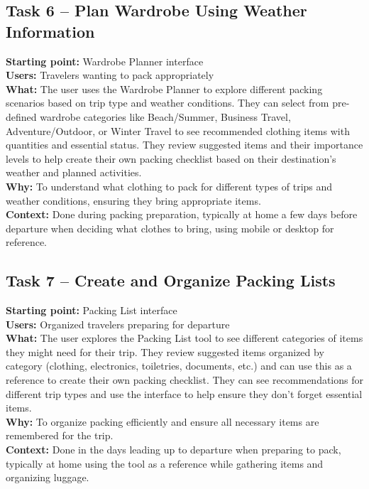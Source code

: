 \documentclass[11pt,a4paper]{article}
\begin{document}
\subsection*{Task 6 – Plan Wardrobe Using Weather Information}
\textbf{Starting point:} Wardrobe Planner interface \\
\textbf{Users:} Travelers wanting to pack appropriately \\
\textbf{What:} The user uses the Wardrobe Planner to explore different packing scenarios based on trip type and weather conditions. They can select from pre-defined wardrobe categories like Beach/Summer, Business Travel, Adventure/Outdoor, or Winter Travel to see recommended clothing items with quantities and essential status. They review suggested items and their importance levels to help create their own packing checklist based on their destination's weather and planned activities. \\
\textbf{Why:} To understand what clothing to pack for different types of trips and weather conditions, ensuring they bring appropriate items. \\
\textbf{Context:} Done during packing preparation, typically at home a few days before departure when deciding what clothes to bring, using mobile or desktop for reference.

\subsection*{Task 7 – Create and Organize Packing Lists}
\textbf{Starting point:} Packing List interface \\
\textbf{Users:} Organized travelers preparing for departure \\
\textbf{What:} The user explores the Packing List tool to see different categories of items they might need for their trip. They review suggested items organized by category (clothing, electronics, toiletries, documents, etc.) and can use this as a reference to create their own packing checklist. They can see recommendations for different trip types and use the interface to help ensure they don't forget essential items. \\
\textbf{Why:} To organize packing efficiently and ensure all necessary items are remembered for the trip. \\
\textbf{Context:} Done in the days leading up to departure when preparing to pack, typically at home using the tool as a reference while gathering items and organizing luggage.
\end{document}
